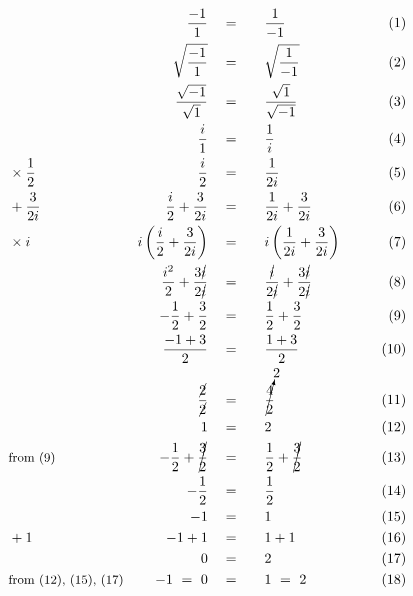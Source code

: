 \begin{alignat*}{5}
&\,&\frac{-1}{1}\quad&=\quad&&\frac{1}{-1}&(1)\\
&\,&\sqrt{\frac{-1}{1}}\quad&=&&\sqrt{\frac{1}{-1}}&(2)\\
&\,&\frac{\sqrt{-1}}{\sqrt{1}}\quad&=&&\frac{\sqrt{1}}{\sqrt{-1}}&(3)\\
&\,&\frac{i}{1}\quad&=&&\frac{1}{i}&(4)\\
&\small\times\frac{1}{2}&\frac{i}{2}\quad&=&&\frac{1}{2i}&(5)\\
&\small+\frac{3}{2i}&\frac{i}{2}+\frac{3}{2i}\quad&=&&\frac{1}{2i}+\frac{3}{2i}&(6)\\
&\times i&i\left(\frac{i}{2}+\frac{3}{2i}\right)\quad&=&&i\left(\frac{1}{2i}+\frac{3}{2i}\right)\qquad&(7)\\
&\,&\frac{i^2}{2}+\frac{3\cancel{i}}{2\cancel{i}}\quad&=&&\frac{\cancel{i}}{2\cancel{i}}+\frac{3\cancel{i}}{2\cancel{i}}&(8)\\
&\,&-\frac{1}{2}+\frac{3}{2}\quad&=&&\frac{1}{2}+\frac{3}{2}&(9)\\
&\,&\frac{-1+3}{2}\quad&=&&\frac{1+3}{2}&(10)\\
&\,&\frac{\cancel{2}}{\cancel{2}}\quad&=&&\cancelto{2}{\frac{4}{2}}&(11)\\
&\,&1\quad&=&&2&(12)\\
&\small\text{from (9)}&-\frac{1}{2}+\cancel{\frac{3}{2}}\quad&=&&\frac{1}{2}+\cancel{\frac{3}{2}}&(13)\\
&\,&-\frac{1}{2}\quad&=&&\frac{1}{2}&(14)\\
&\,&-1\quad&=&&1&(15)\\
&\small+1&-1+1\quad&=&&1+1&(16)\\
&\,&0\quad&=&&2&(17)\\
&\small\text{from (12), (15), (17)}&-1~=~0\quad&=&&1~=~2&(18)
\end{alignat*}
